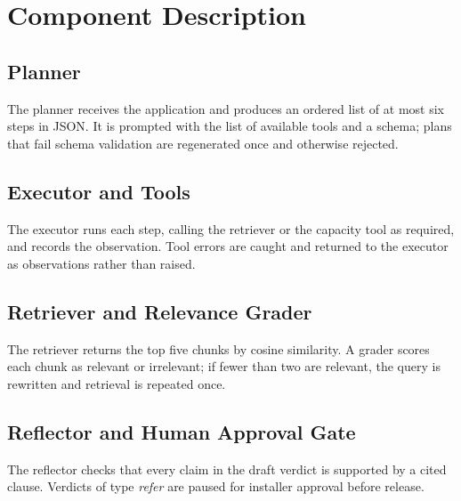 \documentclass[12pt,a4paper,oneside]{report}
\newif\ifguidance
\newcommand{\guide}[1]{%
  \ifguidance
  \begin{tcolorbox}[enhanced,breakable,colback=guidebg,colframe=bmsblue,
    boxrule=0.6pt,arc=2pt,left=6pt,right=6pt,top=4pt,bottom=4pt,
    fonttitle=\bfseries\small,title={What to write here},
    before upper={\small\setstretch{1.1}}]
  #1
  \end{tcolorbox}
  \fi}
\newcommand{\dodont}[2]{%
  \ifguidance
  \begin{tcolorbox}[enhanced,breakable,sidebyside,sidebyside align=top seam,
    colback=dobg,colbacklower=dontbg,colframe=gray!60,boxrule=0.5pt,arc=2pt,
    lefthand ratio=0.5,left=5pt,right=5pt,top=4pt,bottom=4pt,
    fontupper=\small\setstretch{1.05},fontlower=\small\setstretch{1.05}]
  \textbf{\textcolor{ForestGreen}{\checkmark\ Do}}
  \begin{itemize}[leftmargin=12pt,itemsep=1pt,topsep=2pt]#1\end{itemize}
  \tcblower
  \textbf{\textcolor{BrickRed}{$\times$ Don't}}
  \begin{itemize}[leftmargin=12pt,itemsep=1pt,topsep=2pt]#2\end{itemize}
  \end{tcolorbox}
  \fi}
\newenvironment{sample}
  {\par\noindent{\footnotesize\bfseries\textcolor{BrickRed}{[SAMPLE --- replace with your own content]}}\par\color{samplecol}}
  {\par\medskip}
\begin{document}
\section{Component Description}
\guide{One subsection per component: its responsibility, its inputs and outputs, the model or
algorithm it uses, and its failure behaviour.}
\dodont{\item Describe every box in the architecture diagram.
\item State what happens when the component fails.
}
{\item Do not paste code here; code belongs in Chapter~6.
\item Do not describe components that are not in the diagram.
}

\subsection{Planner}
\begin{sample}
The planner receives the application and produces an ordered list of at most six steps in JSON. It
is prompted with the list of available tools and a schema; plans that fail schema validation are
regenerated once and otherwise rejected.
\end{sample}
\subsection{Executor and Tools}
\begin{sample}
The executor runs each step, calling the retriever or the capacity tool as required, and records the
observation. Tool errors are caught and returned to the executor as observations rather than raised.
\end{sample}
\subsection{Retriever and Relevance Grader}
\begin{sample}
The retriever returns the top five chunks by cosine similarity. A grader scores each chunk as relevant
or irrelevant; if fewer than two are relevant, the query is rewritten and retrieval is repeated once.
\end{sample}
\subsection{Reflector and Human Approval Gate}
\begin{sample}
The reflector checks that every claim in the draft verdict is supported by a cited clause. Verdicts of
type \emph{refer} are paused for installer approval before release.
\end{sample}
\end{document}
